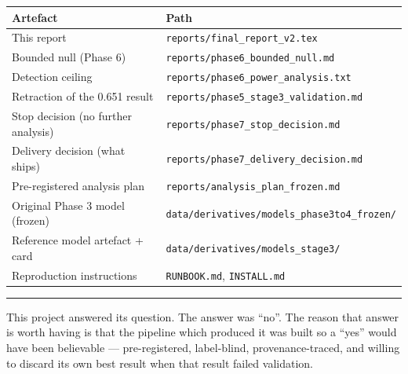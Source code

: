 \documentclass[11pt]{article}
\begin{document}
\begin{longtable}{ll}
\toprule
Artefact & Path \\
\midrule
\endhead
This report & \texttt{reports/final\_report\_v2.tex} \\
Bounded null (Phase 6) & \texttt{reports/phase6\_bounded\_null.md} \\
Detection ceiling & \texttt{reports/phase6\_power\_analysis.txt} \\
Retraction of the 0.651 result & \texttt{reports/phase5\_stage3\_validation.md} \\
Stop decision (no further analysis) & \texttt{reports/phase7\_stop\_decision.md} \\
Delivery decision (what ships) & \texttt{reports/phase7\_delivery\_decision.md} \\
Pre-registered analysis plan & \texttt{reports/analysis\_plan\_frozen.md} \\
Original Phase 3 model (frozen) & \texttt{data/derivatives/models\_phase3to4\_frozen/} \\
Reference model artefact + card & \texttt{data/derivatives/models\_stage3/} \\
Reproduction instructions & \texttt{RUNBOOK.md}, \texttt{INSTALL.md} \\
\bottomrule
\end{longtable}

\vspace{0.4cm}
\hrule
\vspace{0.3cm}
{\small\color{headergray}\noindent
This project answered its question. The answer was ``no''. The reason that answer
is worth having is that the pipeline which produced it was built so a ``yes''
would have been believable --- pre-registered, label-blind, provenance-traced,
and willing to discard its own best result when that result failed validation.}
\end{document}

